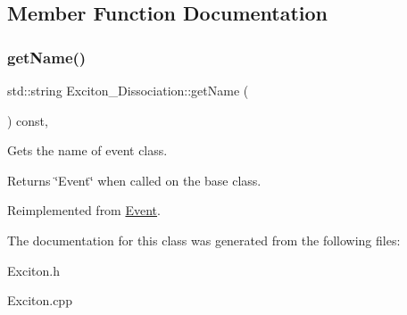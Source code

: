 \subsection{Member Function Documentation}
\mbox{\label{class_exciton___dissociation_a1cfdbcfa3930666e0fddea28cc18ac9e}} 
\subsubsection{\texorpdfstring{get\+Name()}{getName()}}
{\footnotesize\ttfamily std\+::string Exciton\+\_\+\+Dissociation\+::get\+Name (\begin{DoxyParamCaption}{ }\end{DoxyParamCaption}) const\hspace{0.3cm}{\ttfamily [inline]}, {\ttfamily [virtual]}}



Gets the name of event class. 

\begin{DoxyReturn}{Returns}
\char`\"{}\+Event\char`\"{} when called on the base class. 
\end{DoxyReturn}


Reimplemented from \hyperlink{class_event_a8c38a406d844d05eac1ef007bad2487f}{Event}.



The documentation for this class was generated from the following files\+:\begin{DoxyCompactItemize}
\item 
Exciton.\+h\item 
Exciton.\+cpp\end{DoxyCompactItemize}
